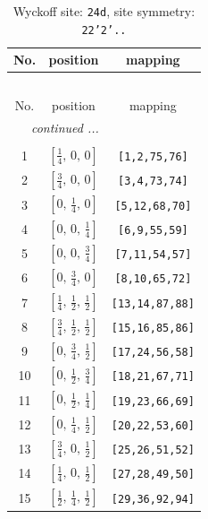 \documentclass[fleqn,8pt]{jsarticle}
\begin{document}
\begin{longtable}{ccc}
\caption{Wyckoff site: {\tt 24d}, site symmetry: {\tt 22'2'..}}
 \\
 \hline \hline
No. & position & mapping \\ \hline \endfirsthead

\multicolumn{2}{l}{\tablename\ \thetable{}} \\
 \hline \hline
No. & position & mapping \\ \hline \endhead

 \hline \hline
\multicolumn{2}{r}{\footnotesize\it continued ...} \\ \endfoot

 \hline \hline
\multicolumn{2}{r}{} \\ \endlastfoot

1 & $\left[ \frac{1}{4},\, 0,\, 0 \right]$ & {\tt [1,2,75,76]} \\ \hline
2 & $\left[ \frac{3}{4},\, 0,\, 0 \right]$ & {\tt [3,4,73,74]} \\ \hline
3 & $\left[ 0,\, \frac{1}{4},\, 0 \right]$ & {\tt [5,12,68,70]} \\ \hline
4 & $\left[ 0,\, 0,\, \frac{1}{4} \right]$ & {\tt [6,9,55,59]} \\ \hline
5 & $\left[ 0,\, 0,\, \frac{3}{4} \right]$ & {\tt [7,11,54,57]} \\ \hline
6 & $\left[ 0,\, \frac{3}{4},\, 0 \right]$ & {\tt [8,10,65,72]} \\ \hline
7 & $\left[ \frac{1}{4},\, \frac{1}{2},\, \frac{1}{2} \right]$ & {\tt [13,14,87,88]} \\ \hline
8 & $\left[ \frac{3}{4},\, \frac{1}{2},\, \frac{1}{2} \right]$ & {\tt [15,16,85,86]} \\ \hline
9 & $\left[ 0,\, \frac{3}{4},\, \frac{1}{2} \right]$ & {\tt [17,24,56,58]} \\ \hline
10 & $\left[ 0,\, \frac{1}{2},\, \frac{3}{4} \right]$ & {\tt [18,21,67,71]} \\ \hline
11 & $\left[ 0,\, \frac{1}{2},\, \frac{1}{4} \right]$ & {\tt [19,23,66,69]} \\ \hline
12 & $\left[ 0,\, \frac{1}{4},\, \frac{1}{2} \right]$ & {\tt [20,22,53,60]} \\ \hline
13 & $\left[ \frac{3}{4},\, 0,\, \frac{1}{2} \right]$ & {\tt [25,26,51,52]} \\ \hline
14 & $\left[ \frac{1}{4},\, 0,\, \frac{1}{2} \right]$ & {\tt [27,28,49,50]} \\ \hline
15 & $\left[ \frac{1}{2},\, \frac{1}{4},\, \frac{1}{2} \right]$ & {\tt [29,36,92,94]} \\ \hline

\end{longtable}
\end{document}
